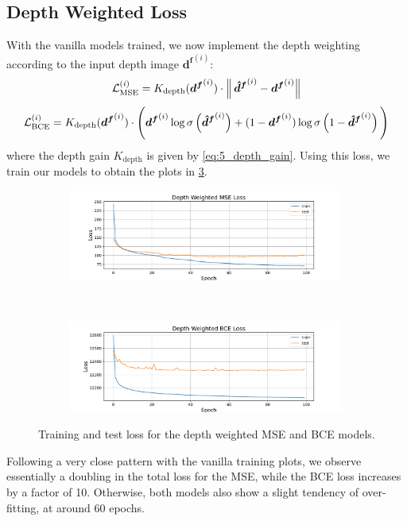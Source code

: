 \subsection{Depth Weighted Loss}
\label{sec:8_depth}
With the vanilla models trained, we now implement the depth weighting according to the input depth image $\boldsymbol{d^f}^{(i)}$:
\begin{equation}
    \mathcal{L}^{(i)}_{\text{MSE}} =  K_\text{depth}(\boldsymbol{d^f}^{(i)}) \cdot \left\lVert\, \boldsymbol{\hat{d}^f}^{(i)} - \boldsymbol{d^f}^{(i)}\right\rVert
    \label{eq:8_mse_depth_weighted_loss}
\end{equation}
\begin{equation}
    \mathcal{L}^{(i)}_{\text{BCE}} = K_\text{depth}(\boldsymbol{d^f}^{(i)}) \cdot \Bigg( \boldsymbol{d^f}^{(i)} \log \sigma\left(\boldsymbol{\hat{d}^f}^{(i)}\right) +  (1 - \boldsymbol{d^f}^{(i)}) \log \sigma\left(1 - \boldsymbol{\hat{d}^f}^{(i)}\right) \Bigg)
    \label{eq:8_bce_depth_weighted_loss}
\end{equation}
where the depth gain $K_\text{depth}$ is given by \cref{eq:5_depth_gain}. Using this loss, we train our models to obtain the plots in \cref{fig:8_depth_vae}.
\begin{figure}[htb]
    \centering
    \begin{subfigure}[b]{\textwidth}
        \centering
        \captionsetup{justification=centering}
        \includegraphics[width=0.99\textwidth]{figures/8_/2_final_MSE_depth_weighted10.pdf}
        \label{fig:2_final_MSE_depth_weighted10}
    \end{subfigure} \\
    \begin{subfigure}[b]{\textwidth}
        \centering
        \captionsetup{justification=centering}
        \includegraphics[width=0.99\textwidth]{figures/8_/5_final_BCE_depth_weighted10.pdf}
        \label{fig:5_final_BCE_depth_weighted10}
    \end{subfigure} 
    \caption{Training and test loss for the depth weighted MSE and BCE models.}
    \label{fig:8_depth_vae}
\end{figure}
Following a very close pattern with the vanilla training plots, we observe essentially a doubling in the total loss for the MSE, while the BCE loss increases by a factor of 10. Otherwise, both models also show a slight tendency of over-fitting, at around 60 epochs. 


